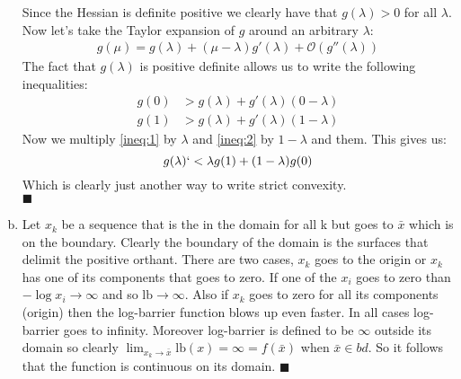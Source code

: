 \documentclass{article}
\begin{document}
\begin{enumerate}[(a)]
\begin{equation}
		\end{equation}
		Since the Hessian is definite positive we clearly have that $g(\lambda) >0$ for all $\lambda$.
		Now let's take the Taylor expansion of $g$ around an arbitrary $\lambda$:
		\begin{align*}
			g(\mu) = g(\lambda) + (\mu - \lambda) g'(\lambda)  + \mathcal{O}(g''(\lambda))
		\end{align*}
		The fact that $g(\lambda)$ is positive definite allows us to write the following inequalities:
		\begin{align}
			g(0)  &> g(\lambda) + g'(\lambda)( 0-\lambda) \label{ineq:1}\\
			g(1) &> g(\lambda) + g'(\lambda) (1-\lambda)\label{ineq:2}
		\end{align}
		Now we multiply \ref{ineq:1} by $\lambda$ and \ref{ineq:2} by $1-\lambda$ and them. This gives us:
		\begin{equation}
			g(\lambda) `< \lambda g(1) + (1-\lambda )g(0)
		\end{equation}
		Which is clearly just another way to write strict convexity.\\
		$\blacksquare$
		\item	Let $x_k$ be a sequence that is the in the domain for all k but goes to $\bar x$ which is on the boundary. Clearly the boundary of the domain is the surfaces that delimit the positive orthant. There are two cases, $x_k$ goes to the origin or $x_k$ has one of its components that goes to zero. If one of the $x_i$ goes to zero than $-\log x_i \rightarrow \infty$ and so $\mathrm{lb} \rightarrow \infty$. Also if $x_k$ goes to zero for all its components (origin) then the log-barrier function blows up even faster. In all cases log-barrier goes to infinity. Moreover log-barrier is defined to be $\infty$ outside its domain so clearly $\lim_{x_k\rightarrow \bar x} \mathrm{lb} (x) = \infty = f(\bar x)$ when $\bar x \in bd$. So it follows that the function is continuous on its domain.
		$\blacksquare$
	\end{enumerate}
	
	
	
	
	
	
	
	
\end{document}
